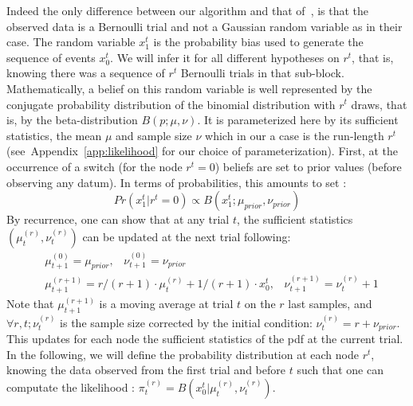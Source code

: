 \documentclass[12pt,english]{article}%
\newcommand{\eql}[1]{\begin{equation}#1\end{equation}}
\newcommand{\eqa}[1]{\begin{align}#1\end{align}}
\newcommand{\citep}[1]{\parencite{#1}}
\newcommand{\seeApp}[1]{Appendix~\ref{app:#1}}
\begin{document}
Indeed the only difference between our algorithm and that of~\citep{AdamsMackay2007},
is that the observed data is a Bernoulli trial and not a Gaussian random variable as in their case.
The random variable $x_1^t$ is the probability bias used
to generate the sequence of events $x_0^t$.
We will infer it for all different hypotheses on $r^t$,
that is, knowing there was a sequence of $r^t$ Bernoulli trials in that sub-block.
Mathematically, a belief on this random variable
is well represented by the conjugate probability distribution of the binomial distribution with $r^t$ draws,
that is, by the beta-distribution $B(p; \mu, \nu)$.
It is parameterized here by its sufficient statistics,
the mean $\mu$ and sample size $\nu$ which in our a case is the run-length $r^t$
(see~\seeApp{likelihood} for our choice of parameterization).
First, at the occurrence of a switch (for the node $r^t=0$)
beliefs are set to prior values (before observing any datum).
In terms of probabilities, this amounts to set :
\eql{
Pr(x_1^t | r^t=0) \propto B(x_1^t; \mu_{prior}, \nu_{prior})
}
By recurrence, one can show that at any trial $t$,
the sufficient statistics $(\mu^{(r)}_{t}, \nu^{(r)}_{t})$
can be updated at the next trial following:
\eqa{
& \mu^{(0)}_{t+1} = \mu_{prior} \text{,} \quad \nu^{(0)}_{t+1} = \nu_{prior} \\
& \mu^{(r+1)}_{t+1} = r/(r+1) \cdot \mu^{(r)}_{t} + 1/(r+1) \cdot x_0^t \text{,} \quad \nu^{(r+1)}_{t+1} = \nu^{(r)}_{t} + 1
}
Note that $\mu^{(r+1)}_{t+1}$ is a moving average at trial $t$ on the $r$ last samples,
and $\forall r, t; \nu^{(r)}_{t}$ is the sample size corrected by the initial condition:
$\nu^{(r)}_{t} = r + \nu_{prior}$.
This updates for each node the sufficient statistics of the pdf at the current trial.
In the following, we will define the probability distribution at each node $r^t$,
knowing the data observed from the first trial and before $t$ such that
one can computate the likelihood :
$
\pi^{(r)}_t = B( x_0^t |  \mu^{(r)}_{t}, \nu^{(r)}_{t})
$. %
\end{document}
